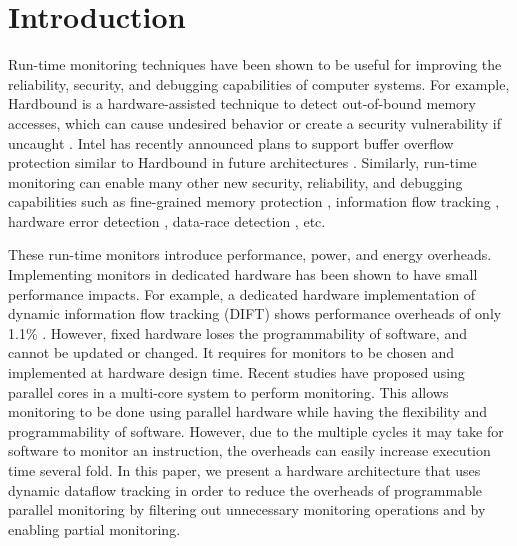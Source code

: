 \section{Introduction}
\label{sec:intro}

Run-time monitoring techniques have been shown to be useful for improving the
reliability, security, and debugging capabilities of computer systems. For
example, Hardbound is a hardware-assisted technique to detect out-of-bound
memory accesses, which can cause undesired behavior or create a security
vulnerability if uncaught \cite{hardbound-asplos08}.  Intel has
recently announced plans to support buffer overflow protection similar to
Hardbound in future architectures \cite{intel-mpx}. Similarly, run-time
monitoring can enable many other new security, reliability, and debugging
capabilities such as fine-grained memory protection \cite{mondrian-asplos02},
information flow tracking \cite{dift-asplos04, testudo-micro08}, hardware error
detection \cite{argus-micro07}, data-race detection \cite{radish-isca12,
cord-hpca06}, etc. 

These run-time monitors introduce performance, power, and energy overheads.
Implementing monitors in dedicated hardware has been shown to have small
performance impacts. For example, a dedicated hardware implementation of
dynamic information flow tracking (DIFT) shows performance
overheads of only 1.1\% \cite{dift-asplos04}. However, fixed hardware loses
the programmability of software, and cannot be updated or changed. It 
requires for monitors to be chosen and implemented at hardware design time.
Recent studies \cite{lba-isca08, ruwase-spaa08, paralog-asplos10, oases-sigops09} have proposed using parallel cores in a
multi-core system to perform monitoring. This allows monitoring to be done
using parallel hardware while having the flexibility and programmability of
software. However, due to the multiple cycles it may take for software to
monitor an instruction, the overheads can easily increase execution time
several fold.
In this paper, we present a hardware architecture that uses dynamic dataflow
tracking in order to reduce the overheads of programmable parallel monitoring
by filtering out unnecessary monitoring operations and by enabling partial
monitoring.

